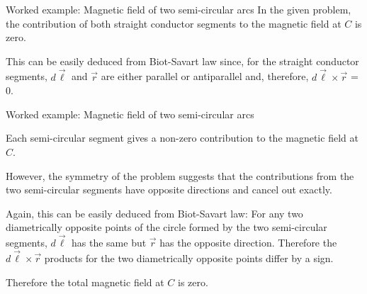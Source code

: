 {\begin{frame}{Worked example: Magnetic field of two semi-circular arcs}
 In the given problem, the contribution of both straight conductor segments
 to the magnetic field at $C$ is zero.\\
 \vspace{0.3cm}

 This can be easily deduced from Biot-Savart law since,
 for the straight conductor segments, $d\vec{\ell}$ and $\vec{r}$
 are either parallel or antiparallel and, therefore,
 $d\vec{\ell} \times \vec{r}$ = 0.\\

\end{frame}

%
%
%

\begin{frame}{Worked example: Magnetic field of two semi-circular arcs}

 Each semi-circular segment gives a non-zero contribution to the
 magnetic field at $C$.\\
 \vspace{0.3cm}

 However, the symmetry of the problem suggests that
 the contributions from the two semi-circular segments have opposite
 directions and cancel out exactly.\\
 \vspace{0.3cm}

 Again, this can be easily deduced from Biot-Savart law:
 For any two diametrically opposite points of the circle formed by the
 two semi-circular segments, $d\vec{\ell}$ has the same but $\vec{r}$
 has the opposite direction. Therefore the $d\vec{\ell} \times \vec{r}$
 products for the two diametrically opposite points differ by a sign.\\
 \vspace{0.3cm}

 Therefore the total magnetic field at $C$ is zero.

\end{frame}

} %



%
%

